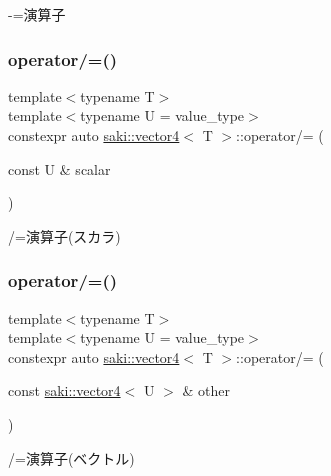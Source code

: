 -\/=演算子 

\mbox{\label{classsaki_1_1vector4_af16bb700b952faa321775357a7926d8b}} 
\subsubsection{\texorpdfstring{operator/=()}{operator/=()}\hspace{0.1cm}{\footnotesize\ttfamily [1/2]}}
{\footnotesize\ttfamily template$<$typename T$>$ \\
template$<$typename U  = value\+\_\+type$>$ \\
constexpr auto \mbox{\hyperlink{classsaki_1_1vector4}{saki\+::vector4}}$<$ T $>$\+::operator/= (\begin{DoxyParamCaption}\item[{const U \&}]{scalar }\end{DoxyParamCaption})\hspace{0.3cm}{\ttfamily [inline]}}



/=演算子(スカラ) 

\mbox{\label{classsaki_1_1vector4_a4801bb02c1dcbbdde6be286699085628}} 
\subsubsection{\texorpdfstring{operator/=()}{operator/=()}\hspace{0.1cm}{\footnotesize\ttfamily [2/2]}}
{\footnotesize\ttfamily template$<$typename T$>$ \\
template$<$typename U  = value\+\_\+type$>$ \\
constexpr auto \mbox{\hyperlink{classsaki_1_1vector4}{saki\+::vector4}}$<$ T $>$\+::operator/= (\begin{DoxyParamCaption}\item[{const \mbox{\hyperlink{classsaki_1_1vector4}{saki\+::vector4}}$<$ U $>$ \&}]{other }\end{DoxyParamCaption})\hspace{0.3cm}{\ttfamily [inline]}}



/=演算子(ベクトル) 

